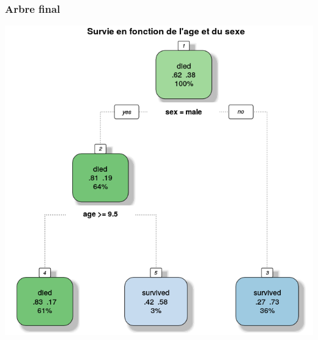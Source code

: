 \documentclass[compress]{beamer}
\begin{document}
\begin{frame}
\frametitle{Arbre final}

      \begin{center}
           \includegraphics[width=\textwidth,height=0.8\textheight,keepaspectratio]{img/fancy.png}
        \end{center}
\end{frame}
\end{document}
